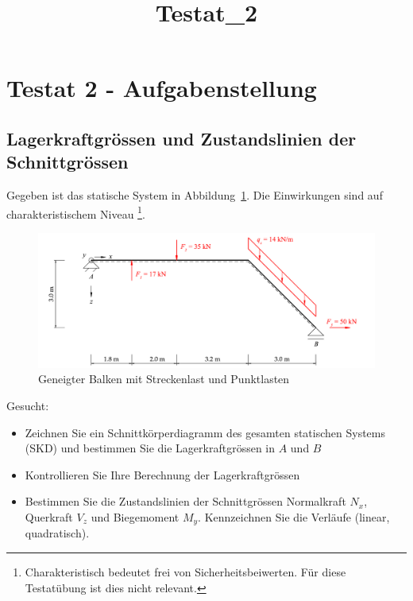 \documentclass[
  12pt,
  letterpaper,
  DIV=11,
  egregdoesnotlikesansseriftitles]{scrartcl}
\title{Testat\_2}
\author{}
\date{}
\providecommand{\tightlist}{%
  \setlength{\itemsep}{0pt}\setlength{\parskip}{0pt}}\usepackage{longtable,booktabs,array}
\renewcommand{\maketitle}{}
\begin{document}
\maketitle
\ifdefined\Shaded\renewenvironment{Shaded}{\begin{tcolorbox}[enhanced, frame hidden, interior hidden, borderline west={3pt}{0pt}{shadecolor}, sharp corners, boxrule=0pt, breakable]}{\end{tcolorbox}}\fi

\hypertarget{testat-2---aufgabenstellung}{%
\section{Testat 2 -
Aufgabenstellung}\label{testat-2---aufgabenstellung}}

\hypertarget{lagerkraftgruxf6ssen-und-zustandslinien-der-schnittgruxf6ssen}{%
\subsection{Lagerkraftgrössen und Zustandslinien der
Schnittgrössen}\label{lagerkraftgruxf6ssen-und-zustandslinien-der-schnittgruxf6ssen}}

Gegeben ist das statische System in Abbildung~\ref{fig-system}. Die
Einwirkungen sind auf charakteristischem Niveau \footnote{Charakteristisch
  bedeutet frei von Sicherheitsbeiwerten. Für diese Testatübung ist dies
  nicht relevant.}.

\begin{figure}[H]

{\centering \includegraphics{BSI_HS23_Testat_02_files/mediabag/../images/Testat_02_HS23.pdf}

}

\caption{\label{fig-system}Geneigter Balken mit Streckenlast und
Punktlasten}

\end{figure}

Gesucht:

\begin{itemize}
\tightlist
\item
  Zeichnen Sie ein Schnittkörperdiagramm des gesamten statischen Systems
  (SKD) und bestimmen Sie die Lagerkraftgrössen in \(A\) und \(B\)
\item
  Kontrollieren Sie Ihre Berechnung der Lagerkraftgrössen
\item
  Bestimmen Sie die Zustandslinien der Schnittgrössen Normalkraft
  \(N_x\), Querkraft \(V_z\) und Biegemoment \(M_y\). Kennzeichnen Sie
  die Verläufe (linear, quadratisch).
\end{itemize}
\end{document}
